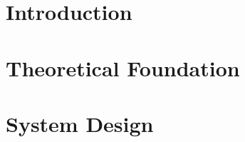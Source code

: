 \documentclass[12pt]{report}
\begin{document}
\tableofcontents

\chapter{Introduction}





\chapter{Theoretical Foundation}\label{chap:2}



\chapter{System Design}\label{chap:3}







\printbibliography
\end{document}
